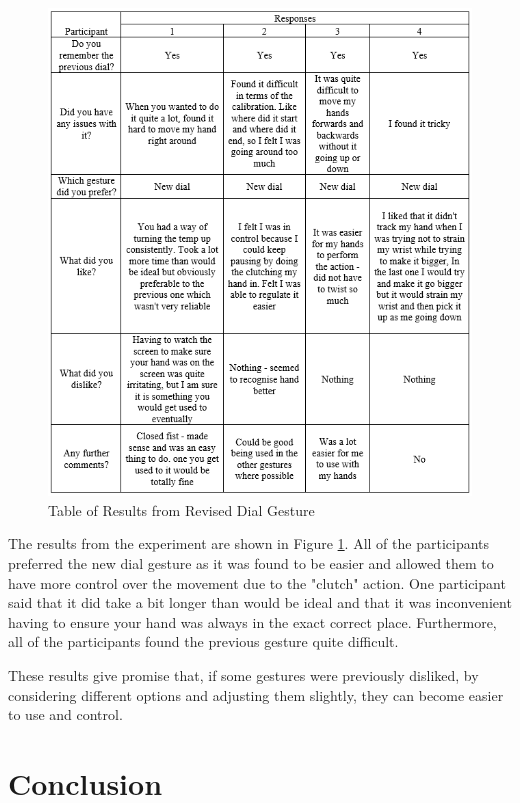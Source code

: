 \documentclass{l4proj}
\begin{document}
\begin{figure}[!htb]
    \centering
    \includegraphics[scale = 0.8]{images/furtherGesture.png}
    \caption{Table of Results from Revised Dial Gesture}
    \label{fig:revisedGesture}
\end{figure}

The results from the experiment are shown in Figure \ref{fig:revisedGesture}. All of the participants preferred the new dial gesture as it was found to be easier and allowed them to have more control over the movement due to the "clutch" action. One participant said that it did take a bit longer than would be ideal and that it was inconvenient having to ensure your hand was always in the exact correct place. Furthermore, all of the participants found the previous gesture quite difficult. 

These results give promise that, if some gestures were previously disliked, by considering different options and adjusting them slightly, they can become easier to use and control.

\chapter{Conclusion}    
\end{document}
